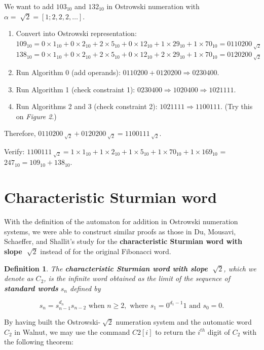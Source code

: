 \documentclass[a4paper]{article}
\newtheorem{definition}{Definition}
\begin{document}
\begin{minipage}{\columnwidth}

We want to add $103_{10}$ and $132_{10}$ in Ostrowski numeration with $\alpha = \sqrt[~]{2}= [1; 2,2,2,\dots].$

\begin{enumerate}
\item Convert into Ostrowski representation:\\
$109_{10} = 0\times1_{10}+0\times2_{10}+2\times5_{10}+0\times12_{10}+1\times29_{10}+1\times70_{10}= 0110200_{\sqrt[]{2}}$
\\
$138_{10} = 0\times1_{10}+0\times2_{10}+2\times5_{10}+0\times12_{10}+2\times29_{10}+1\times70_{10} = 0120200_{\sqrt[]{2}}$
\item Run Algorithm 0 (add operands): $0110200 + 0120200 \Rightarrow 0230400$.
\item Run Algorithm 1 (check constraint 1): $0230400 \Rightarrow 1020400 \Rightarrow 1021111$.
\item Run Algorithms 2 and 3 (check constraint 2): $1021111 \Rightarrow 1100111$. (Try this on \emph{Figure 2}.)
\end{enumerate}

Therefore, $0110200_{\sqrt[]{2}}+0120200_{\sqrt[]{2}}=1100111_{\sqrt[]{2}}$.

Verify:
$1100111_{\sqrt[]{2}}  = 1\times1_{10}+1\times2_{10}+1\times5_{10}+1\times70_{10}+1\times169_{10}$ = $247_{10} = 109_{10}+138_{10}$.\\

\end{minipage}

\section{Characteristic Sturmian word}

With the definition of the automaton for addition in Ostrowski numeration systems, we were able to construct similar proofs as those in Du, Mousavi, Schaeffer, and Shallit's study \cite{fibonacci} for the \textbf{characteristic Sturmian word with slope $\sqrt[~]{2}$} instead of for the original Fibonacci word.
\begin{definition}
The \textbf{characteristic Sturmian word with slope $\sqrt[~]{2}$}, which we denote as $C_2$, is the infinite word obtained as the limit of the sequence of \textbf{standard words} $s_n$ defined by{

$$ s_n=s^{d_n}_{n-1}s_{n-2} \text{ when } n\ge 2, \text{ where } s_1= 0^{d_1-1}1 \text{ and } s_0=0.$$}
\end{definition}
By having built the Ostrowski-$\sqrt[~]{2}$ numeration system and the automatic word $C_2$ in Walnut, we may use the command $C2[i]$ to return the $i^{th}$ digit of $C_2$ with the following theorem:\\
\end{document}
